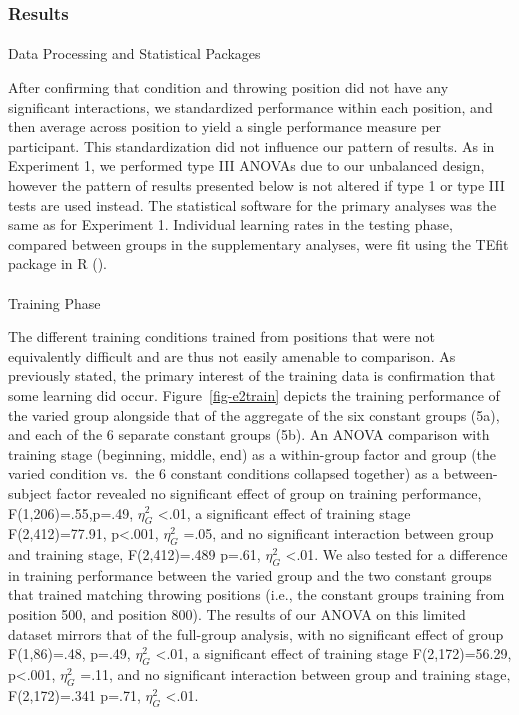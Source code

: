 \documentclass[
  11pt,
  letterpaper,
]{article}
\makeatletter
\let\oldparagraph\paragraph
\renewcommand{\paragraph}{
    \@ifstar
      \xxxParagraphStar
      \xxxParagraphNoStar
  }
\newcommand{\xxxParagraphStar}[1]{\oldparagraph*{#1}\mbox{}}
\newcommand{\xxxParagraphNoStar}[1]{\oldparagraph{#1}\mbox{}}
\makeatother
\begin{document}
\subsubsection{Results}\label{results-1}

\paragraph{Data Processing and Statistical
Packages}\label{data-processing-and-statistical-packages-1}

After confirming that condition and throwing position did not have any
significant interactions, we standardized performance within each
position, and then average across position to yield a single performance
measure per participant. This standardization did not influence our
pattern of results. As in Experiment 1, we performed type III ANOVAs due
to our unbalanced design, however the pattern of results presented below
is not altered if type 1 or type III tests are used instead. The
statistical software for the primary analyses was the same as for
Experiment 1. Individual learning rates in the testing phase, compared
between groups in the supplementary analyses, were fit using the TEfit
package in R
().

\paragraph{Training Phase}\label{training-phase-1}

The different training conditions trained from positions that were not
equivalently difficult and are thus not easily amenable to comparison.
As previously stated, the primary interest of the training data is
confirmation that some learning did occur. Figure~\ref{fig-e2train}
depicts the training performance of the varied group alongside that of
the aggregate of the six constant groups (5a), and each of the 6
separate constant groups (5b). An ANOVA comparison with training stage
(beginning, middle, end) as a within-group factor and group (the varied
condition vs.~the 6 constant conditions collapsed together) as a
between-subject factor revealed no significant effect of group on
training performance, F(1,206)=.55,p=.49, \(\eta^{2}_G\) \textless.01, a
significant effect of training stage F(2,412)=77.91, p\textless.001,
\(\eta^{2}_G\) =.05, and no significant interaction between group and
training stage, F(2,412)=.489 p=.61, \(\eta^{2}_G\) \textless.01. We
also tested for a difference in training performance between the varied
group and the two constant groups that trained matching throwing
positions (i.e., the constant groups training from position 500, and
position 800). The results of our ANOVA on this limited dataset mirrors
that of the full-group analysis, with no significant effect of group
F(1,86)=.48, p=.49, \(\eta^{2}_G\) \textless.01, a significant effect of
training stage F(2,172)=56.29, p\textless.001, \(\eta^{2}_G\) =.11, and
no significant interaction between group and training stage,
F(2,172)=.341 p=.71, \(\eta^{2}_G\) \textless.01.
\end{document}

